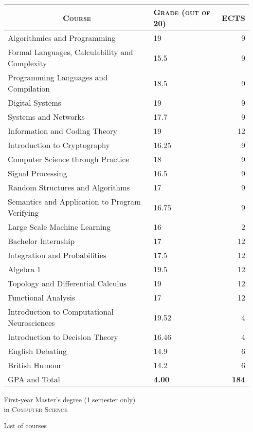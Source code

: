 \documentclass[a4paper,10pt]{article} %
\begin{document}
\begin{center}
\begin{tabular}{llr}
  \multicolumn{1}{c}{\textsc{Course}} & \textsc{Grade (out of 20)}&\textsc{ECTS}\\ \hline
  Algorithmics and Programming & 19 & 9 \\
  Formal Languages, Calculability and Complexity & 15.5 & 9 \\
  Programming Languages and Compilation & 18.5 & 9 \\
  Digital Systems & 19 & 9 \\
  Systems and Networks & 17.7 & 9 \\
  Information and Coding Theory & 19 & 12 \\
  Introduction to Cryptography & 16.25 & 9 \\
  Computer Science through Practice & 18 & 9 \\
  Signal Processing & 16.5 & 9 \\
  Random Structures and Algorithms & 17 & 9 \\
  Semantics and Application to Program Verifying & 16.75 & 9 \\
  Large Scale Machine Learning & 16 & 2 \\
  Bachelor Internship & 17 & 12 \\
  \hline
  Integration and Probabilities & 17.5 & 12 \\
  Algebra 1 & 19.5 & 12 \\
  Topology and Differential Calculus & 19 & 12 \\
  Functional Analysis & 17 & 12 \\
  \hline
  Introduction to Computational Neurosciences & 19.52 & 4 \\
  Introduction to Decision Theory & 16.46 & 4 \\
  \hline
  English Debating & 14.9 & 6 \\
  British Humour & 14.2 & 6 \\
  \hline
  \textsc{GPA} and Total & \textbf{4.00} & \textbf{184}
\end{tabular}
\end{center}

\vspace{2cm}

\par{\centering\Large \hypertarget{notes}{First-year Master's degree (1 semester
    only) \\in \textsc{Computer Science}}\par}\large{\centering List of courses\par}\normalsize
\end{document}
